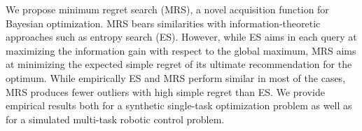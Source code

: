 

\begin{block}{}
\justifying
We propose minimum regret search (MRS), a novel acquisition function for Bayesian
optimization. MRS bears similarities with information-theoretic approaches
such as entropy search (ES). However, while ES aims in each query at maximizing the
information gain with respect to the global maximum, MRS aims at minimizing the
expected simple regret of its ultimate recommendation for the optimum. While empirically ES and MRS perform similar in most of the
cases, MRS produces fewer outliers with high simple regret than ES. We provide empirical
results both for a synthetic single-task optimization problem as well as for a
simulated multi-task robotic control problem.
\end{block}

